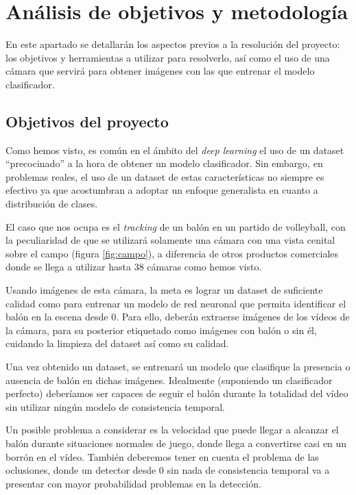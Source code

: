 \section{Análisis de objetivos y metodología}

En este apartado se detallarán los aspectos previos a la resolución del proyecto: los objetivos y herramientas a utilizar para resolverlo, así como el uso de una cámara que servirá para obtener imágenes con las que entrenar el modelo clasificador.

\subsection{Objetivos del proyecto}

Como hemos visto, es común en el ámbito del \textit{deep learning} el uso de un dataset ``precocinado'' a la hora de obtener un modelo clasificador. Sin embargo, en problemas reales, el uso de un dataset de estas características no siempre es efectivo ya que acostumbran a adoptar un enfoque generalista en cuanto a distribución de clases.

El caso que nos ocupa es el \textit{tracking} de un balón en un partido de volleyball, con la peculiaridad de que se utilizará solamente una cámara con una vista cenital sobre el campo (figura \ref{fig:campo}), a diferencia de otros productos comerciales donde se llega a utilizar hasta 38 cámaras como hemos visto.

Usando imágenes de esta cámara, la meta es lograr un dataset de suficiente calidad como para entrenar un modelo de red neuronal que permita identificar el balón en la escena desde 0. Para ello, deberán extraerse imágenes de los vídeos de la cámara, para su posterior etiquetado como imágenes con balón o sin él, cuidando la limpieza del dataset así como su calidad.

Una vez obtenido un dataset, se entrenará un modelo que clasifique la presencia o ausencia de balón en dichas imágenes. Idealmente (suponiendo un clasificador perfecto) deberíamos ser capaces de seguir el balón durante la totalidad del vídeo sin utilizar ningún modelo de consistencia temporal.

Un posible problema a considerar es la velocidad que puede llegar a alcanzar el balón durante situaciones normales de juego, donde llega a convertirse casi en un borrón en el vídeo. También deberemos tener en cuenta el problema de las oclusiones, donde un detector desde 0 sin nada de consistencia temporal va a presentar con mayor probabilidad problemas en la detección.

